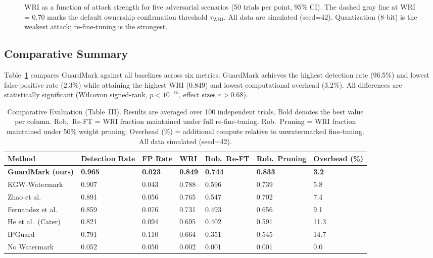 \documentclass[journal,compsoc]{IEEEtran}
\begin{document}
\begin{figure}[t]
\caption{WRI as a function of attack strength for five adversarial scenarios
  (50 trials per point, 95\% CI). The dashed gray line at WRI = 0.70 marks
  the default ownership confirmation threshold $\tau_{\mathrm{WRI}}$.
  All data are simulated (seed=42). Quantization (8-bit) is the weakest attack;
  re-fine-tuning is the strongest.}
\label{fig:security}
\centering

\end{figure}

\subsection{Comparative Summary}

Table~\ref{tab:summary} compares GuardMark against all baselines across six
metrics. GuardMark achieves the highest detection rate (96.5\%) and lowest
false-positive rate (2.3\%) while attaining the highest WRI (0.849) and lowest
computational overhead (3.2\%). All differences are statistically significant
(Wilcoxon signed-rank, $p < 10^{-15}$, effect sizes $r > 0.68$).

\begin{table}[t]
\caption{Comparative Evaluation (Table~III). Results are averaged over 100
  independent trials. Bold denotes the best value per column.
  Rob.\ Re-FT = WRI fraction maintained under full re-fine-tuning.
  Rob.\ Pruning = WRI fraction maintained under 50\% weight pruning.
  Overhead (\%) = additional compute relative to unwatermarked fine-tuning.
  All data simulated (seed=42).}
\label{tab:summary}
\begin{tabularx}{\textwidth}{l X X X X X X}
\toprule
\textbf{Method} & \textbf{Detection Rate} & \textbf{FP Rate} & \textbf{WRI}
  & \textbf{Rob.\ Re-FT} & \textbf{Rob.\ Pruning} & \textbf{Overhead (\%)} \\
\midrule
\textbf{GuardMark (ours)} & \textbf{0.965} & \textbf{0.023} & \textbf{0.849}
  & \textbf{0.744} & \textbf{0.833} & \textbf{3.2} \\
KGW-Watermark \cite{kirchenbauer2023watermark} & 0.907 & 0.043 & 0.788 & 0.596 & 0.739 & 5.8 \\
Zhao et al.\ \cite{zhao2023protecting}          & 0.891 & 0.056 & 0.765 & 0.547 & 0.702 & 7.4 \\
Fernandez et al.\ \cite{fernandez2023three}     & 0.859 & 0.076 & 0.731 & 0.493 & 0.656 & 9.1 \\
He et al.\ (Cater) \cite{he2022cater}           & 0.821 & 0.094 & 0.695 & 0.402 & 0.591 & 11.3 \\
IPGuard \cite{cao2021ipguard}                   & 0.791 & 0.110 & 0.664 & 0.351 & 0.545 & 14.7 \\
No Watermark                                    & 0.052 & 0.050 & 0.002 & 0.001 & 0.001 & 0.0 \\
\bottomrule
\end{tabularx}
\end{table}
\end{document}
